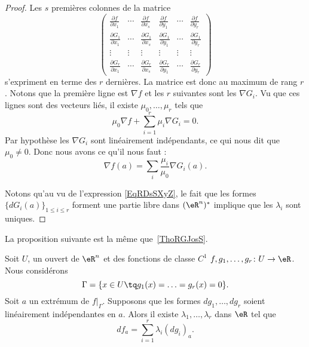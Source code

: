 \begin{proof}
    Les \( s\) premières colonnes de la matrice
    \begin{equation}
        \begin{pmatrix}
            \frac{ \partial f }{ \partial x_1 }   &   \cdots    &   \frac{ \partial f }{ \partial x_s }    &   \frac{ \partial f }{ \partial y_1 }    &   \cdots    &   \frac{ \partial f }{ \partial y_r }\\
            \frac{ \partial G_1 }{ \partial x_1 }    &   \cdots    &   \frac{ \partial G_1 }{ \partial x_s }    &   \frac{ \partial G_1 }{ \partial y_1 }    &   \cdots    &   \frac{ \partial G_1 }{ \partial y_r }\\
            \vdots    &   \vdots    &   \vdots    &   \vdots    &   \vdots    &   \vdots\\
            \frac{ \partial G_r }{ \partial x_1 }    &   \cdots    &   \frac{ \partial G_r }{ \partial x_s }    &   \frac{ \partial G_r }{ \partial y_1 }    &  \cdots   & \frac{ \partial G_r }{ \partial y_r }
        \end{pmatrix}
    \end{equation}
    s'expriment en terme des \( r\) dernières. La matrice est donc au maximum de rang \( r\). Notons que la première ligne est \( \nabla f\) et les \( r\) suivantes sont les \( \nabla G_i\). Vu que ces lignes sont des vecteurs liés, il existe \( \mu_0,\ldots, \mu_r\) tels que
    \begin{equation}
        \mu_0\nabla f+\sum_{i=1}^r\mu_i\nabla G_i=0.
    \end{equation}
    Par hypothèse les \( \nabla G_i\) sont linéairement indépendants, ce qui nous dit que \( \mu_0\neq 0\). Donc nous avons ce qu'il nous faut :
    \begin{equation}
        \nabla f(a)=\sum_i\frac{ \mu_i }{ \mu_0 } \nabla G_i(a).
    \end{equation}

    Notons qu'au vu de l'expression \eqref{EqRDsSXyZ}, le fait que les formes \( \{ dG_i(a) \}_{1\leq i\leq r}\) forment une partie libre dans \( (\eR^n)^*\) implique que les \( \lambda_i\) sont uniques.
\end{proof}

La proposition suivante est la même que~\ref{ThoRGJosS}.
\begin{proposition} \label{PropfPPUxh}
    Soit \( U\), un ouvert de \( \eR^n\) et des fonctions de classe \( C^1\) \( f,g_1,\ldots, g_r\colon U\to \eR\). Nous considérons
    \begin{equation}
        \Gamma=\{ x\in U\tq g_1(x)=\ldots=g_r(x)=0 \}.
    \end{equation}
    Soit \( a\) un extrémum de \( f|_{\Gamma}\). Supposons que les formes \( dg_1,\ldots, dg_r\) soient linéairement indépendantes en \( a\). Alors il existe \( \lambda_1,\ldots, \lambda_r\) dans \( \eR\) tel que
    \begin{equation}
        df_a=\sum_{i=1}^r\lambda_i(dg_i)_a.
    \end{equation}
\end{proposition}

